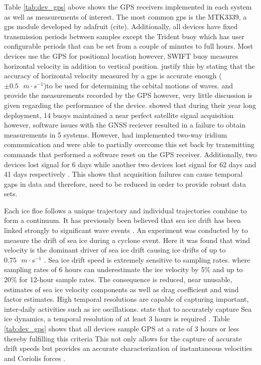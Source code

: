 Table \ref{tab:dev_gps} above shows the GPS receivers implemented in each system as well as measurements of interest. The most common gps is the MTK3339, a gps module developed by adafruit (cite). Additionally, all devices have fixed transmission periods between samples except the Trident buoy which has user configurable periods that can be set from a couple of minutes to full hours. Most devices use the GPS for positional location however, SWIFT buoy measures horizontal velocity in addition to vertical position\cite{thomson2012wave}. \textcite{thomson2012wave} justify this by stating that the accuracy of horizontal velocity measured by a gps is accurate enough ($\pm 0.5 \text{ }m\cdot s^{-1}$)to be used for determining the orbital motions of waves. \textcite{kohout2015device} and \textcite{rabault2019open} provide the measurements recorded by the GPS however, very little discussion is given regarding the performance of the device. \textcite{doble2017robust} showed that during their year long deployment, 14 buoys maintained a near perfect satellite signal acquisition however, software issues with the GNSS reciever resulted in a failure to obtain measurements in 5 systems. However, \textcite{doble2017robust} had implemented two-way iridium communication and were able to partially overcome this set back by transmitting commands that performed a software reset on the GPS receiver. Additionally, two devices lost signal for 6 days while another two devices lost signal for 62 days and 41 days respectively \cite{doble2013wave}. This shows that acquisition failures can cause temporal gaps in data and therefore, need to be reduced in order to provide robust data sets.

Each ice floe follows a unique trajectory \cite{lepparanta2001sea}  and individual trajectories combine to form a continuum. It has previously been believed that sea ice drift has been linked strongly to significant wave events \cite{alberello2019drift}. An experiment was conducted by \textcite{alberello2019drift} to measure the drift of sea ice during a cyclone event. Here it was found that wind velocity is the dominant driver of sea ice drift \cite{alberello2019drift} causing ice drifts of up to $0.75\text{ } m\cdot s^{-1}$ \cite{alberello2019drift}. Sea ice drift speed is extremely sensitive to sampling rates. \cite{alberello2019drift} where sampling rates of 6 hours can underestimate the ice velocity by 5\% \cite{alberello2019drift} and up to 20\% for 12-hour sample rates. The consequence is reduced, near unusable, estimates of sea ice velocity components as well as drag coefficient and wind factor estimates. High temporal resolutions are capable of capturing important, inter-daily activities such as ice oscillations. \textcite{alberello2019drift} state that to accurately capture Sea ice dynamics, a temporal resolution of at least 3 hours is required \cite{alberello2019drift}. Table \ref{tab:dev_gps} shows that all devices sample GPS at a rate of 3 hours or less thereby fulfilling this criteria This not only allows for the capture of accurate drift speeds but provides an accurate characterization of instantaneous velocities and Coriolis forces \cite{alberello2019drift}. 
